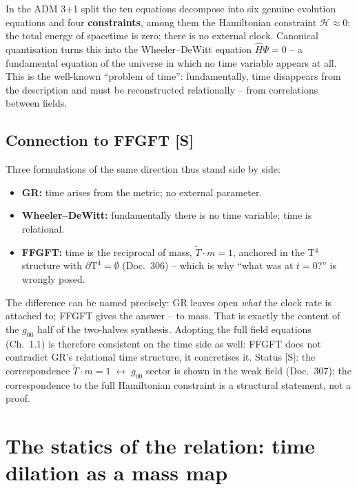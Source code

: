 \documentclass[11pt]{report}
\begin{document}
In the ADM 3+1 split the ten equations decompose into six genuine
evolution equations and four \textbf{constraints}, among them the
Hamiltonian constraint $\mathcal{H} \approx 0$: the total energy of
spacetime is zero; there is no external clock. Canonical
quantisation turns this into the Wheeler--DeWitt equation
$\hat{H}\Psi = 0$ -- a fundamental equation of the universe in
which no time variable appears at all. This is the well-known
\enquote{problem of time}: fundamentally, time disappears from the
description and must be reconstructed relationally -- from
correlations between fields.

\section{Connection to FFGFT [S]}

Three formulations of the same direction thus stand side by side:

\begin{itemize}
  \item \textbf{GR:} time arises from the metric; no external
        parameter.
  \item \textbf{Wheeler--DeWitt:} fundamentally there is no time
        variable; time is relational.
  \item \textbf{FFGFT:} time is the reciprocal of mass,
        $\tilde T \cdot m = 1$, anchored in the T$^4$ structure with
        $\partial\text{T}^4 = \emptyset$ (Doc.~306) -- which is why
        \enquote{what was at $t=0$?} is wrongly posed.
\end{itemize}

The difference can be named precisely: GR leaves open \emph{what}
the clock rate is attached to; FFGFT gives the answer -- to mass.
That is exactly the content of the $g_{00}$ half of the two-halves
synthesis. Adopting the full field equations (Ch.~1.1) is therefore
consistent on the time side as well: FFGFT does not contradict GR's
relational time structure, it concretises it. Status [S]: the
correspondence $\tilde T \cdot m = 1 \;\leftrightarrow\; g_{00}$
sector is shown in the weak field (Doc.~307); the correspondence to
the full Hamiltonian constraint is a structural statement, not a
proof.

\chapter{The statics of the relation: time dilation as a mass map}
\end{document}
